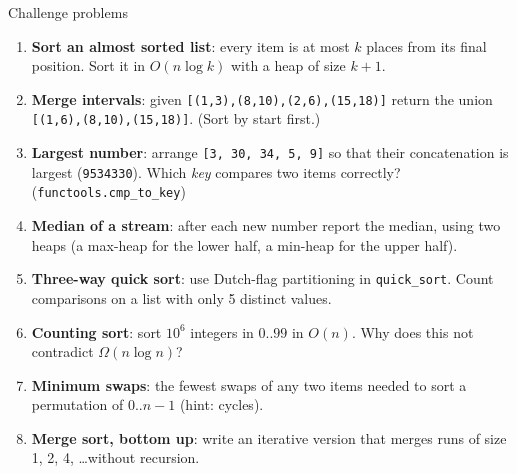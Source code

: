 \documentclass[aspectratio=169,10pt]{beamer}
\begin{document}
\begin{frame}{Challenge problems}
\begin{enumerate}\setlength\itemsep{2pt}\small
\item \textbf{Sort an almost sorted list}: every item is at most $k$ places from its final position. Sort it in $O(n\log k)$ with a heap of size $k+1$.
\item \textbf{Merge intervals}: given \texttt{[(1,3),(8,10),(2,6),(15,18)]} return the union \texttt{[(1,6),(8,10),(15,18)]}. (Sort by start first.)
\item \textbf{Largest number}: arrange \texttt{[3, 30, 34, 5, 9]} so that their concatenation is largest (\texttt{9534330}). Which \emph{key} compares two items correctly? (\texttt{functools.cmp\_to\_key})
\item \textbf{Median of a stream}: after each new number report the median, using two heaps (a max-heap for the lower half, a min-heap for the upper half).
\item \textbf{Three-way quick sort}: use Dutch-flag partitioning in \texttt{quick\_sort}. Count comparisons on a list with only 5 distinct values.
\item \textbf{Counting sort}: sort $10^6$ integers in $0..99$ in $O(n)$. Why does this not contradict $\Omega(n\log n)$?
\item \textbf{Minimum swaps}: the fewest swaps of any two items needed to sort a permutation of $0..n-1$ (hint: cycles).
\item \textbf{Merge sort, bottom up}: write an iterative version that merges runs of size 1, 2, 4, \dots without recursion.
\end{enumerate}
\end{frame}
\end{document}
